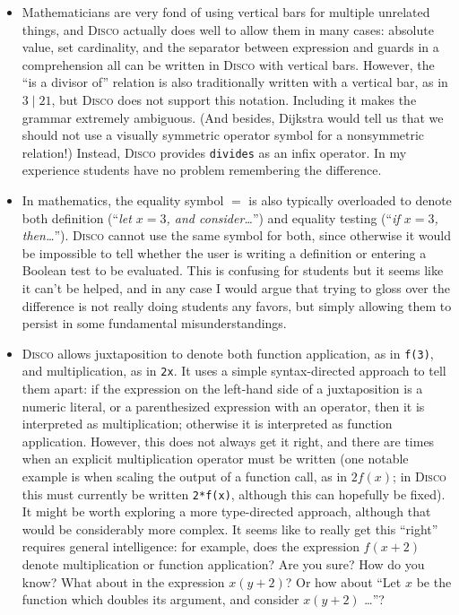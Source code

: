 \documentclass[submission,copyright,creativecommons]{eptcs}
\newcommand{\disco}{\textsc{Disco}\xspace}
\begin{document}
\begin{itemize}
\item Mathematicians are very fond of using vertical bars for multiple
  unrelated things, and \disco actually does well to allow them in
  many cases: absolute value, set cardinality, and the separator
  between expression and guards in a comprehension all can be written
  in \disco with vertical bars.  However, the ``is a divisor of''
  relation is also traditionally written with a vertical bar, as in
  $3 \mid 21$, but \disco does not support this notation.  Including
  it makes the grammar extremely ambiguous.  (And besides, Dijkstra
  would tell us that we should not use a visually symmetric operator
  symbol for a nonsymmetric relation!) Instead, \disco provides
  \texttt{divides} as an infix operator.  In my experience students
  have no problem remembering the difference.
\item In mathematics, the equality symbol $=$ is also typically
  overloaded to denote both definition (``\emph{let $x = 3$, and
    consider\dots}'') and equality testing (``\emph{if $x = 3$,
    then\dots}'').  \disco cannot use the same symbol for both, since
  otherwise it would be impossible to tell whether the user is writing
  a definition or entering a Boolean test to be evaluated.  This is
  confusing for students but it seems like it can't be helped, and in
  any case I would argue that trying to gloss over the difference is
  not really doing students any favors, but simply allowing them to
  persist in some fundamental misunderstandings.
\item \disco allows juxtaposition to denote both function application,
  as in \texttt{f(3)}, and multiplication, as in \texttt{2x}.  It uses
  a simple syntax-directed approach to tell them apart: if the
  expression on the left-hand side of a juxtaposition is a numeric
  literal, or a parenthesized expression with an operator, then it is
  interpreted as multiplication; otherwise it is interpreted as
  function application.  However, this does not always get it right,
  and there are times when an explicit multiplication operator must be
  written (one notable example is when scaling the output of a
  function call, as in $2f(x)$; in \disco this must currently be
  written \texttt{2*f(x)}, although this can hopefully be
  fixed).  It might be worth exploring a more type-directed approach,
  although that would be considerably more complex.  It seems like to
  really get this ``right'' requires general intelligence: for
  example, does the expression $f(x+2)$ denote multiplication or
  function application?  Are you sure?  How do you know?  What about
  in the expression $x(y+2)$?  Or how about ``Let $x$ be the function
  which doubles its argument, and consider $x(y+2)$ \dots''?
\end{itemize}
\end{document}
